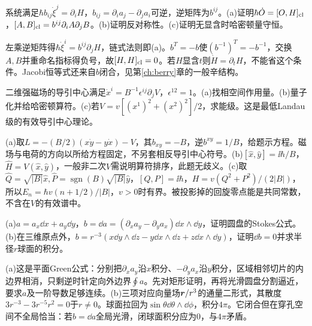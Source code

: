 \begin{exercise}[原题1(a)--(c)]
系统满足$\hbar b_{ij}\dot\xi^j=\partial_iH$，$b_{ij}=\partial_ia_j-\partial_ja_i$可逆，逆矩阵为$b^{ij}$。(a)证明$\hbar\dot O=[O,H]_{\rm cl}$，$[A,B]_{\rm cl}=b^{ij}\partial_iA\partial_jB$。(b)证明反对称性。(c)证明无显含时哈密顿量守恒。
\end{exercise}
\begin{solution}
左乘逆矩阵得$\hbar\dot\xi^i=b^{ij}\partial_jH$，链式法则即(a)。$b^T=-b$使$(b^{-1})^T=-b^{-1}$，交换$A,B$并重命名指标得负号，故$[H,H]_{\rm cl}=0$。若$H$显含$t$则$\dot H=\partial_tH$，不能省这个条件。Jacobi恒等式还来自$b$闭合，见第\ref{ch:berry}章的一般辛结构。
\end{solution}
\begin{exercise}[原题2(a)--(c)]
二维强磁场的导引中心满足$\dot x^i=B^{-1}\epsilon^{ij}\partial_jV$，$\epsilon^{12}=1$。(a)找相空间作用量。(b)量子化并给哈密顿算符。(c)若$V=v[(x^1)^2+(x^2)^2]/2$，求能级。这是最低Landau级的有效导引中心理论。
\end{exercise}
\begin{solution}
(a)取$L=-(B/2)(x\dot y-y\dot x)-V$，其$b_{xy}=-B$，逆$b^{xy}=1/B$，给题示方程。磁场与电荷的方向以所给方程固定，不另套相反导引中心符号。(b)$[\hat x,\hat y]=\ii\hbar/B$，$\hat H=V(\hat x,\hat y)$，一般非二次$V$需说明算符排序，此题无歧义。(c)取$\hat Q=\sqrt{|B|}\hat x,\hat P=\operatorname{sgn}(B)\sqrt{|B|}\hat y$，$[Q,P]=\ii\hbar$，$H=v(Q^2+P^2)/(2|B|)$，所以$E_n=\hbar v(n+1/2)/|B|$，$v>0$时有界。被投影掉的回旋零点能是共同常数，不含在$V$的有效谱中。
\end{solution}
\begin{exercise}[原题3(a)--(b)]
(a)$a=a_x\dd x+a_y\dd y$，$b=\dd a=(\partial_xa_y-\partial_ya_x)\dd x\wedge\dd y$，证明圆盘的Stokes公式。(b)在三维原点外，$b=r^{-3}(x\dd y\wedge\dd z-y\dd x\wedge\dd z+z\dd x\wedge\dd y)$，证明$\dd b=0$并求半径$r$球面的积分。
\end{exercise}
\begin{solution}
(a)这是平面Green公式：分别把$\partial_xa_y$沿$x$积分、$-\partial_ya_x$沿$y$积分，区域相邻切片的内边界相消，只剩逆时针定向外边界$\oint a$。先对矩形证明，再将光滑圆盘分割逼近，要求$a$及一阶导数足够连续。(b)三项对应向量场$\boldsymbol{r}/r^3$的通量二形式，其散度$3r^{-3}-3r^{-5}r^2=0$于$r\ne0$。球面拉回为$\sin\theta\dd\theta\wedge\dd\phi$，积分$4\pi$。它闭合但在穿孔空间不全局恰当：若$b=\dd a$全局光滑，闭球面积分应为0，与$4\pi$矛盾。
\end{solution}
